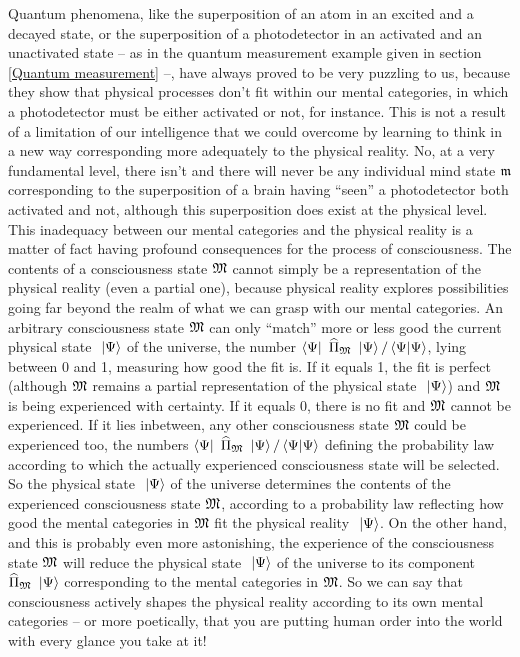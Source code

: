 \documentclass[10pt,a4paper,twoside,openany]{book}
\begin{document}
Quantum phenomena, like the superposition of an atom in an excited and a decayed state, or the superposition of a photodetector in an activated and an unactivated state -- as in the quantum measurement example given in section \ref{Quantum measurement} --, have always proved to be very puzzling to us, because they show that physical processes don't fit within our mental categories, in which a photodetector must be either activated or not, for instance. This is not a result of a limitation of our intelligence that we could overcome by learning to think in a new way corresponding more adequately to the physical reality. No, at a very fundamental level, there isn't and there will never be any individual mind state $\mathfrak{m}$ corresponding to the superposition of a brain having ``seen'' a photodetector both activated and not, although this superposition does exist at the physical level. This inadequacy between our mental categories and the physical reality is a matter of fact having profound consequences for the process of consciousness. The contents of a consciousness state $\mathfrak{M}$ cannot simply be a representation of the physical reality (even a partial one), because physical reality explores possibilities going far beyond the realm of what we can grasp with our mental categories. An arbitrary consciousness state $\mathfrak{M}$ can only ``match'' more or less good the current physical state $\ \left|{\Psi}\right\rangle$ of the universe, the number $\left\langle{\Psi}\right|\  \widehat{\Pi}_{\mathfrak{M}} \ \left|{\Psi}\right\rangle / \left\langle{\Psi}|{\Psi}\right\rangle$, lying between 0 and 1, measuring how good the fit is. If it equals 1, the fit is perfect (although $\mathfrak{M}$ remains a partial representation of the physical state $\ \left|{\Psi}\right\rangle$) and $\mathfrak{M}$ is being experienced with certainty. If it equals 0, there is no fit and $\mathfrak{M}$ cannot be experienced. If it lies inbetween, any other consciousness state $\mathfrak{M}$ could be experienced too, the numbers $\left\langle{\Psi}\right|\  \widehat{\Pi}_{\mathfrak{M}} \ \left|{\Psi}\right\rangle / \left\langle{\Psi}|{\Psi}\right\rangle$ defining the probability law according to which the actually experienced consciousness state will be selected. So the physical state $\ \left|{\Psi}\right\rangle$ of the universe determines the contents of the experienced consciousness state $\mathfrak{M}$, according to a probability law reflecting how good the mental categories in $\mathfrak{M}$ fit the physical reality $\ \left|{\Psi}\right\rangle$. On the other hand, and this is probably even more astonishing, the experience of the consciousness state $\mathfrak{M}$ will reduce the physical state $\ \left|{\Psi}\right\rangle$ of the universe to its component $\widehat{\Pi}_{\mathfrak{M}} \ \left|{\Psi}\right\rangle$ corresponding to the mental categories in $\mathfrak{M}$. So we can say that consciousness actively shapes the physical reality according to its own mental categories -- or more poetically, that you are putting human order into the world with every glance you take at it!
\end{document}
